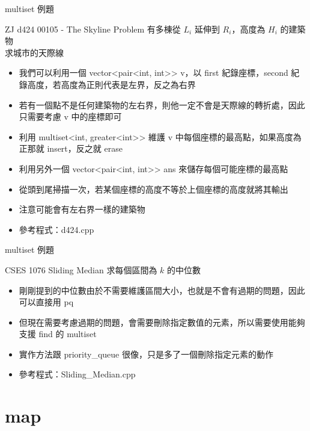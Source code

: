 \documentclass[aspectratio=169]{beamer}
\begin{document}
    \begin{frame}{multiset 例題}
        \begin{block}{ZJ d424 00105 - The Skyline Problem}
            有多棟從 $L_i$ 延伸到 $R_i$，高度為 $H_i$ 的建築物\\
            求城市的天際線
        \end{block}

        \begin{itemize}
            \item<2-> 我們可以利用一個 vector<pair<int, int>> v，以 first 紀錄座標，second 紀錄高度，若高度為正則代表是左界，反之為右界
            \item<3-> 若有一個點不是任何建築物的左右界，則他一定不會是天際線的轉折處，因此只需要考慮 v 中的座標即可
            \item<4-> 利用 multiset<int, greater<int>> 維護 v 中每個座標的最高點，如果高度為正那就 insert，反之就 erase
            \item<5-> 利用另外一個 vector<pair<int, int>> ans 來儲存每個可能座標的最高點
            \item<6-> 從頭到尾掃描一次，若某個座標的高度不等於上個座標的高度就將其輸出
            \item<7-> 注意可能會有左右界一樣的建築物
            \item<8-> 參考程式：d424.cpp
        \end{itemize}
    \end{frame}

    \begin{frame}{multiset 例題}
        \begin{block}{CSES 1076 Sliding Median}
            求每個區間為 $k$ 的中位數
        \end{block}

        \begin{itemize}
            \item<2-> 剛剛提到的中位數由於不需要維護區間大小，也就是不會有過期的問題，因此可以直接用 pq
            \item<3-> 但現在需要考慮過期的問題，會需要刪除指定數值的元素，所以需要使用能夠支援 find 的 multiset
            \item<4-> 實作方法跟 priority\_queue 很像，只是多了一個刪除指定元素的動作
            \item<5-> 參考程式：Sliding\_Median.cpp
        \end{itemize}
    \end{frame}

    \section{map}
\end{document}
